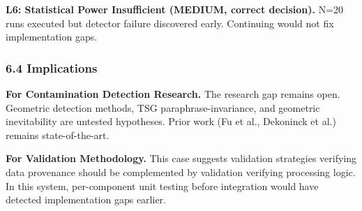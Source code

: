 \textbf{L6: Statistical Power Insufficient (MEDIUM, correct decision).} N=20 runs executed but detector failure discovered early. Continuing would not fix implementation gaps.

\subsubsection{6.4 Implications}

\textbf{For Contamination Detection Research.} The research gap remains open. Geometric detection methods, TSG paraphrase-invariance, and geometric inevitability are untested hypotheses. Prior work (Fu et al., Dekoninck et al.) remains state-of-the-art.

\textbf{For Validation Methodology.} This case suggests validation strategies verifying data provenance should be complemented by validation verifying processing logic. In this system, per-component unit testing before integration would have detected implementation gaps earlier.
